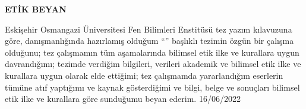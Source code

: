 \begin{center}
\Large\textbf{ETİK BEYAN}
\end{center}
\normalsize
\vspace{3cm}

Eskişehir Osmangazi Üniversitesi Fen Bilimleri Enstitüsü tez yazım kılavuzuna göre, \danisman\space danışmanlığında hazırlamış olduğum “\textbf{\tbaslik}” başlıklı tezimin özgün bir çalışma olduğunu; tez çalışmamın tüm aşamalarında bilimsel etik ilke ve kurallara uygun davrandığımı; tezimde verdiğim bilgileri, verileri akademik ve bilimsel etik ilke ve kurallara uygun olarak elde ettiğimi; tez çalışmamda yararlandığım eserlerin tümüne atıf yaptığımı ve kaynak gösterdiğimi ve bilgi, belge ve sonuçları bilimsel etik ilke ve kurallara göre sunduğumu beyan ederim.   16/06/2022
\vspace{3cm}

\begin{flushright}
\yazar
\end{flushright}